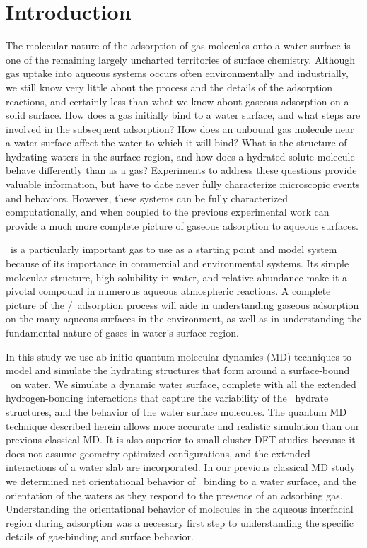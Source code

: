 \section {Introduction}

The molecular nature of the adsorption of gas molecules onto a water surface is one of the remaining largely uncharted territories of surface chemistry. Although gas uptake into aqueous systems occurs often environmentally and industrially, we still know very little about the process and the details of the adsorption reactions, and certainly less than what we know about gaseous adsorption on a solid surface. How does a gas initially bind to a water surface, and what steps are involved in the subsequent adsorption? How does an unbound gas molecule near a water surface affect the water to which it will bind? What is the structure of hydrating waters in the surface region, and how does a hydrated solute molecule behave differently than as a gas? Experiments to address these questions provide valuable information, but have to date never fully characterize microscopic events and behaviors. However, these systems can be fully characterized computationally, and when coupled to the previous experimental work can provide a much more complete picture of gaseous adsorption to aqueous surfaces.

\suldiox~is a particularly important gas to use as a starting point and model system because of its importance in commercial and environmental systems. \cite{Boniface2000,Jayne1990,Johns2011,Heber1997,Faloona2009,Clegg2001} Its simple molecular structure, high solubility in water, and relative abundance make it a pivotal compound in numerous aqueous atmospheric reactions. A complete picture of the \suldiox/\wat~adsorption process will aide in understanding gaseous adsorption on the many aqueous surfaces in the environment, as well as in understanding the fundamental nature of gases in water's surface region. 

In this study we use ab initio quantum molecular dynamics (MD) techniques to model and simulate the hydrating structures that form around a surface-bound \suldiox~on water. We simulate a dynamic water surface, complete with all the extended hydrogen-bonding interactions that capture the variability of the \suldiox~hydrate structures, and the behavior of the water surface molecules. The quantum MD technique described herein allows more accurate and realistic simulation than our previous classical MD.\cite{Shamay2011} It is also superior to small cluster DFT studies because it does not assume geometry optimized configurations, and the extended interactions of a water slab are incorporated. In our previous classical MD study we determined net orientational behavior of \suldiox~binding to a water surface, and the orientation of the waters as they respond to the presence of an adsorbing gas. Understanding the orientational behavior of molecules in the aqueous interfacial region during adsorption was a necessary first step to understanding the specific details of gas-binding and surface behavior. 

